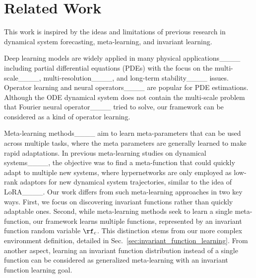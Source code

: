 \section{Related Work}
\label{sec:related_work}
\vspace{-0.05cm}
This work is inspired by the ideas and limitations of previous research in dynamical system forecasting, meta-learning, and invariant learning.


Deep learning models are widely applied in many physical applications____ including partial differential equations (PDEs) with the focus on the multi-scale____, multi-resolution____, and long-term stability____ issues. 
Operator learning and neural operators____ are popular for PDE estimations. Although the ODE dynamical system does not contain the multi-scale problem that Fourier neural operator____ tried to solve, our framework can be considered as a kind of operator learning. 



Meta-learning methods____ aim to learn meta-parameters that can be used across multiple tasks, where the meta parameters are generally learned to make rapid adaptations. In previous meta-learning studies on dynamical systems____, the objective was to find a meta-function that could quickly adapt to multiple new systems, where hypernetworks are only employed as low-rank adaptors for new dynamical system trajectories, similar to the idea of LoRA____. Our work differs from such meta-learning approaches in two key ways. First, we focus on discovering invariant functions rather than quickly adaptable ones. Second, while meta-learning methods seek to learn a single meta-function, our framework learns multiple functions, represented by an invariant function random variable $\rf_c$. This distinction stems from our more complex environment definition, detailed in Sec.~\ref{sec:invariant_function_learning}. From another aspect, learning an invariant function distribution instead of a single function can be considered as generalized meta-learning with an invariant function learning goal. 


